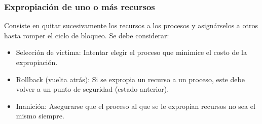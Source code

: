 \documentclass{templateNote}
\begin{document}
\subsubsection*{Expropiación de uno o más recursos}
Consiste en quitar sucesivamente los recursos a los procesos y asignárselos a otros hasta romper el ciclo de bloqueo. Se debe considerar:
\begin{itemize}
    \item Selección de victima: Intentar elegir el proceso que minimice el costo de la expropiación.
    \item Rollback (vuelta atrás): Si se expropia un recurso a un proceso, este debe volver a un punto de seguridad (estado anterior).
    \item Inanición: Asegurarse que el proceso al que se le expropian recursos no sea el mismo siempre.
\end{itemize}
\end{document}
